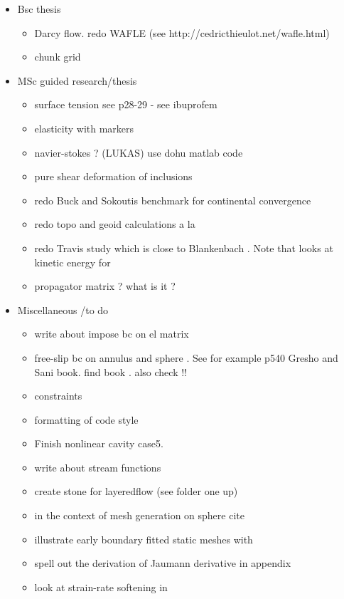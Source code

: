 
\begin{itemize}
\item Bsc thesis
\begin{itemize} 
\item Darcy flow. redo WAFLE (see http://cedricthieulot.net/wafle.html)
\item chunk grid
\end{itemize}
\item MSc guided research/thesis
\begin{itemize} 
\item surface tension see \cite{reddybook2}p28-29 - see ibuprofem 
\item elasticity with markers
\item navier-stokes ? (LUKAS) use dohu matlab code
\item pure shear deformation of inclusions \cite{trla00}
\item redo Buck and Sokoutis benchmark for continental convergence \cite{buso94}
\item redo topo and geoid calculations a la \cite{king09}
\item redo Travis study \cite{trab90} which is close to Blankenbach \cite{blbc89}. Note that \cite{maie12} looks at kinetic energy for \cite{trab90} 
\item propagator matrix ? what is it ? \cite{ribe18} \mscthesis {}  
\Literature \cite{haoc78,haoc81,riha84,zhon96,como97,mohc98,zhzu00,lezh08,leha08,mofm07,wuch08,mibb09,fope91,lizh13,bugo94} 
\end{itemize}
\item Miscellaneous /to do
\begin{itemize} 
\item write about impose bc on el matrix
\item free-slip bc on annulus and sphere . See for example p540 Gresho and Sani book. find book \cite{deab72}.
also check \cite{ensa82} !!
\item constraints \cite{absh79}
\item formatting of code style
\item Finish nonlinear cavity case5.
\item write about stream functions 
\item create stone for layeredflow (see folder one up)
\item in the context of mesh generation on sphere cite \cite{moma19}
\item illustrate early boundary fitted static meshes with \cite{thar85}
\item \cite{bepo10} spell out the derivation of Jaumann derivative in appendix
\item look at strain-rate softening in \cite{belz02}
\end{itemize}



\end{itemize}

